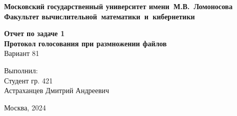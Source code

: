 \begin{titlepage}


\begin{center}
\large{\textbf{Московский государственный университет имени~М.В.~Ломоносова}}\\
\hfill \break
\large{\textbf{Факультет вычислительной~математики~и~кибернетики}}\\
\vspace{6cm}

{\bf\Large Отчет по задаче 1}\\
{\bf\Large Протокол голосования при размножении файлов}\\
\vspace{1cm}
{\Large Вариант 81}\\

\end{center}
\vspace{3cm}
\begin{flushright}

Выполнил:\\
Студент гр. 421\\
Астраханцев Дмитрий Андреевич\\

\end{flushright}

\vfill
\centerline {\large{Москва, 2024}}

\end{titlepage}
\newpage

